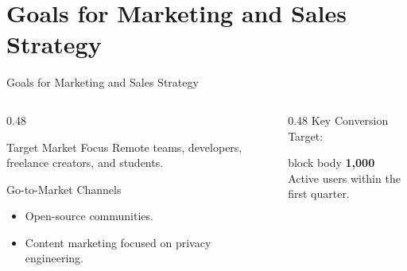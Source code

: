 \documentclass[aspectratio=169]{beamer}
\begin{document}
\section{Goals for Marketing and Sales Strategy}
\begin{frame}{Goals for Marketing and Sales Strategy}
    \begin{columns}[t]
        \begin{column}{0.48\textwidth}
            \begin{block}{Target Market Focus}
                \small Remote teams, developers, freelance creators, and students.
            \end{block}
            \vspace{0.2cm}
            \begin{block}{Go-to-Market Channels}
                \begin{itemize}
                    \small
                    \item Open-source communities.
                    \item Content marketing focused on privacy engineering.
                \end{itemize}
            \end{block}
        \end{column}

        \begin{column}{0.48\textwidth}
            \centering
            \vspace{1cm}
            {\small Key Conversion Target:} %
            \vspace{0.3cm}

            \begin{beamercolorbox}[center,rounded=true,sep=0.4cm]{block body}
                \textcolor{DarkSlate}{\Huge \textbf{1,000}}\\
                \vspace{0.1cm}
                \small Active users within the first quarter.
            \end{beamercolorbox}
        \end{column}
    \end{columns}
\end{frame}

\end{document}
